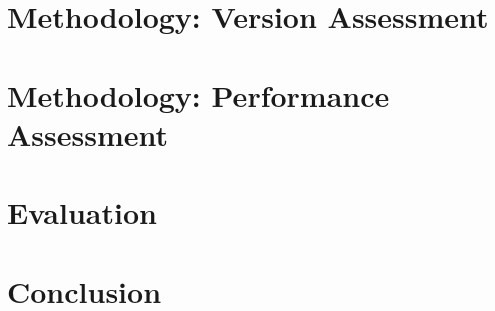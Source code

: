 \documentclass[
	12pt,
	a4paper,
	oneside,
	openright,
	listof=totoc%
]{scrbook}
\begin{document}
\chapter{Methodology: Version Assessment}\label{chapter:4}


\chapter{Methodology: Performance Assessment}\label{chapter:5}


\chapter{Evaluation} \label{chapter:6}


%

\chapter{Conclusion}\label{chapter:7}



\end{document}
